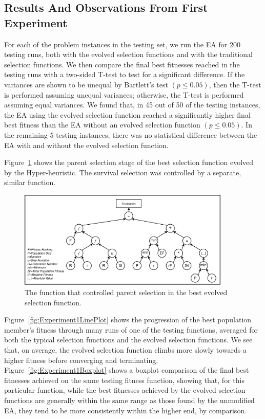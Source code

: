 \documentclass[sigconf]{acmart}
\begin{document}
\subsection{Results And Observations From First Experiment}
\label{firstExperimentResults}

For each of the problem instances in the testing set, we run the EA for 200 testing runs, both with the evolved selection functions and with the traditional selection functions. We then compare the final best fitnesses reached in the testing runs with a two-sided T-test to test for a significant difference. If the variances are shown to be unequal by Bartlett's test $(p \leq 0.05)$, then the T-test is performed assuming unequal variances; otherwise, the T-test is performed assuming equal variances. We found that, in 45 out of 50 of the testing instances, the EA using the evolved selection function reached a significantly higher final best fitness than the EA without an evolved selection function $(p \leq 0.05)$. In the remaining 5 testing instances, there was no statistical difference between the EA with and without the evolved selection function.

Figure~\ref{fig:experiment1Result} shows the parent selection stage of the best selection function evolved by the Hyper-heuristic. The survival selection was controlled by a separate, similar function.

\begin{figure}
	\centering
	\includegraphics[width=0.9\textwidth]{experiment1Result}
	\caption{The function that controlled parent selection in the best evolved selection function.}
	\label{fig:experiment1Result}
\end{figure}

Figure~\ref{fig:Experiment1LinePlot} shows the progression of the best population member's fitness through many runs of one of the testing functions, averaged for both the typical selection functions and the evolved selection functions. We see that, on average, the evolved selection function climbs more slowly towards a higher fitness before converging and terminating. Figure~\ref{fig:Experiment1Boxplot} shows a boxplot comparison of the final best fitnesses achieved on the same testing fitness function, showing that, for this particular function, while the best fitnesses achieved by the evolved selection functions are generally within the same range as those found by the unmodified EA, they tend to be more consistently within the higher end, by comparison.
\end{document}
